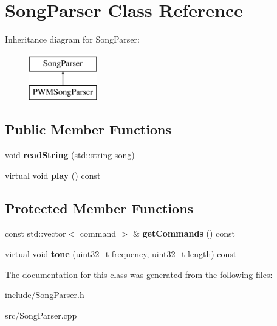\hypertarget{classSongParser}{\section{Song\-Parser Class Reference}
\label{classSongParser}
}
Inheritance diagram for Song\-Parser\-:\begin{figure}[H]
\begin{center}
\leavevmode
\includegraphics[height=2.000000cm]{classSongParser}
\end{center}
\end{figure}
\subsection*{Public Member Functions}
\begin{DoxyCompactItemize}
\item 
\hypertarget{classSongParser_a744cd4ea2db31242c765c3cf1968eba2}{void {\bfseries read\-String} (std\-::string song)}\label{classSongParser_a744cd4ea2db31242c765c3cf1968eba2}

\item 
\hypertarget{classSongParser_a9e10d549966c5140b9d15ffde542a9ca}{virtual void {\bfseries play} () const }\label{classSongParser_a9e10d549966c5140b9d15ffde542a9ca}

\end{DoxyCompactItemize}
\subsection*{Protected Member Functions}
\begin{DoxyCompactItemize}
\item 
\hypertarget{classSongParser_a9de796d5cbc1cbe55181a80250a6bea9}{const std\-::vector$<$ command $>$ \& {\bfseries get\-Commands} () const }\label{classSongParser_a9de796d5cbc1cbe55181a80250a6bea9}

\item 
\hypertarget{classSongParser_a5cf22619c27fb0304e635d11bbeb0d6d}{virtual void {\bfseries tone} (uint32\-\_\-t frequency, uint32\-\_\-t length) const }\label{classSongParser_a5cf22619c27fb0304e635d11bbeb0d6d}

\end{DoxyCompactItemize}


The documentation for this class was generated from the following files\-:\begin{DoxyCompactItemize}
\item 
include/Song\-Parser.\-h\item 
src/Song\-Parser.\-cpp\end{DoxyCompactItemize}
